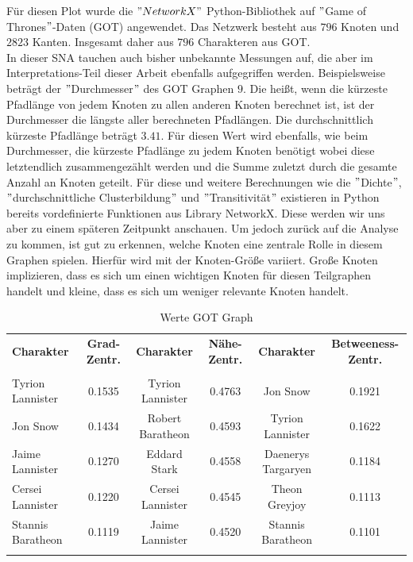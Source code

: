 Für diesen Plot wurde die $"NetworkX"$ Python-Bibliothek auf $"$Game of Thrones$"$-Daten (GOT) angewendet. Das Netzwerk besteht aus $796$ Knoten und $2823$ Kanten. Insgesamt daher aus $796$ Charakteren aus GOT.\\
In dieser SNA tauchen auch bisher unbekannte Messungen auf, die aber im Interpretations-Teil dieser Arbeit ebenfalls aufgegriffen werden. Beispielsweise beträgt der $"$Durchmesser$"$ des GOT Graphen $9$. Die heißt, wenn die kürzeste Pfadlänge von jedem Knoten zu allen anderen Knoten berechnet ist, ist der Durchmesser die längste aller berechneten Pfadlängen. Die durchschnittlich kürzeste Pfadlänge beträgt $3.41$. Für diesen Wert wird ebenfalls, wie beim Durchmesser, die kürzeste Pfadlänge zu jedem Knoten benötigt wobei diese letztendlich zusammengezählt werden und die Summe zuletzt durch die gesamte Anzahl an Knoten geteilt. Für diese und weitere Berechnungen wie die $"$Dichte$"$, $"$durchschnittliche Clusterbildung$"$ und $"$Transitivität$"$ existieren in Python bereits vordefinierte Funktionen aus Library NetworkX. Diese werden wir uns aber zu einem späteren Zeitpunkt anschauen. Um jedoch zurück auf die Analyse zu kommen, ist gut zu erkennen, welche Knoten eine zentrale Rolle in diesem Graphen spielen. Hierfür wird mit der Knoten-Größe variiert. Große Knoten implizieren, dass es sich um einen wichtigen Knoten für diesen Teilgraphen handelt und kleine, dass es sich um weniger relevante Knoten handelt. 
\begin{table}[h!]
\footnotesize
\caption{Werte GOT Graph}
\label{TableGOT}
\begin{tabular}{lccccc}\toprule 
\textbf{Charakter} &\textbf{Grad-Zentr.} & \textbf{Charakter} &\textbf{Nähe-Zentr.}  & \textbf{Charakter} &\textbf{Betweeness-Zentr.} \\
 &\\\midrule
  Tyrion Lannister & 0.1535  & Tyrion Lannister & 0.4763 & Jon Snow& 0.1921   \\
  Jon Snow & 0.1434 & Robert Baratheon & 0.4593 & Tyrion Lannister & 0.1622   \\
  Jaime Lannister & 0.1270  & Eddard Stark& 0.4558& Daenerys Targaryen & 0.1184   \\
  Cersei Lannister & 0.1220 & Cersei Lannister & 0.4545 & Theon Greyjoy & 0.1113   \\
  Stannis Baratheon & 0.1119 & Jaime Lannister & 0.4520 & Stannis Baratheon & 0.1101   \\
       
  \\\bottomrule
 \end{tabular}
 \end{table}
